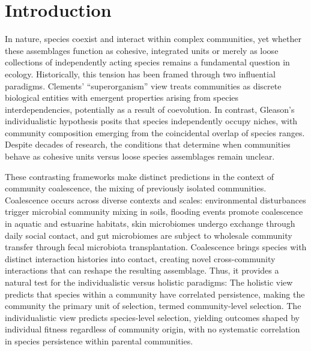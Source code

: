 \section{Introduction}
\label{sec:introduction}

In nature, species coexist and interact within complex communities, yet whether these assemblages function as cohesive, integrated units or merely as loose collections of independently acting species remains a fundamental question in ecology. Historically, this tension has been framed through two influential paradigms. Clements’ “superorganism” view treats communities as discrete biological entities with emergent properties arising from species interdependencies, potentially as a result of coevolution\citep{Clements1916, Clements1936, Odum1969, Lovelock1979, WilsonSober1989}. In contrast, Gleason’s individualistic hypothesis posits that species independently occupy niches, with community composition emerging from the coincidental overlap of species ranges\citep{Gleason1939, Cain1947, Mason1947, Whittaker1967}. Despite decades of research, the conditions that determine when communities behave as cohesive units versus loose species assemblages remain unclear.

These contrasting frameworks make distinct predictions in the context of community coalescence, the mixing of previously isolated communities\citep{Rillig2015, Lechon2021}. Coalescence occurs across diverse contexts and scales: environmental disturbances trigger microbial community mixing in soils\citep{Huet2023, Bresciani2025}, flooding events promote coalescence in aquatic and estuarine habitats\citep{Liu2024}, skin microbiomes undergo exchange through daily social contact\citep{Sarkar2024}, and gut microbiomes are subject to wholesale community transfer through fecal microbiota transplantation\citep{Xiao2020, Gupta2016}. Coalescence brings species with distinct interaction histories into contact, creating novel cross-community interactions that can reshape the resulting assemblage\citep{Rillig2015}. Thus, it provides a natural test for the individualistic versus holistic paradigms: The holistic view predicts that species within a community have correlated persistence, making the community the primary unit of selection, termed community-level selection. The individualistic view predicts species-level selection, yielding outcomes shaped by individual fitness regardless of community origin, with no systematic correlation in species persistence within parental communities.

